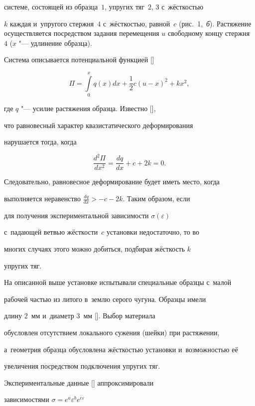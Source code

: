 системе, состоящей из образца~$1$, упругих тяг~$2$, $3$ с~жёсткостью

$k$ каждая и~упругого стержня~$4$ с~жёсткостью, равной~$c$ (рис.~1,~{\sl б}). Растяжение осуществляется посредством задания перемещения $u$ свободному концу стержня~$4$ ($x$ "--- удлинение образца).



Система описывается потенциальной функцией []

$$

\Pi=\int \limits^{x}_{0} q(x) dx + \frac12 c(u-x)^{2}+kx^{2},

$$

где $q$ "--- усилие растяжения образца. Известно [],

что равновесный характер квазистатического деформирования

нарушается тогда, когда

$$

\frac{d^{2}\Pi}{dx^{2}}=\frac{dq}{dx}+c+2k=0.

$$

Следовательно, равновесное деформирование будет иметь место, когда

выполняется неравенство $\frac{dq}{dx}>-c-2k$. Таким образом, если

для получения экспериментальной зависимости $\sigma(\varepsilon)$

с~падающей ветвью жёсткости~$c$ установки недостаточно, то во

многих случаях этого можно добиться, подбирая жёсткость $k$

упругих тяг.



На описанной выше установке испытывали специальные образцы с~малой

рабочей частью из литого в~землю серого чугуна. Образцы имели

длину $2$~мм и~диаметр $3$~мм []. Выбор материала

обусловлен отсутствием локального сужения (шейки) при растяжении,

а~геометрия образца обусловлена жёсткостью установки и~возможностью её 

увеличения посредством подключения упругих тяг.



Экспериментальные данные [] аппроксимировали

зависимостями $\sigma=e^{a} \varepsilon^{b} e^{c \varepsilon}$

